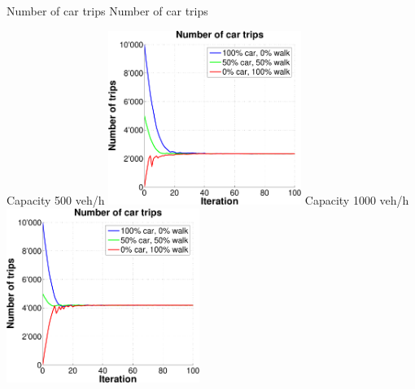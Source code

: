 {}

\createfigure%
{Number of car trips}%
{Number of car trips}%
{\label{fig:InitialModeAverageNumCarTrips}}%
{%
  \createsubfigure%
  {Capacity 500 veh/h}%
  {\includegraphics[width=0.47\textwidth, angle=0, trim=0mm 0mm 0mm 9mm, clip=true]{extending/figures/MultiModalSimulation/simulations/num_car_trips_500}}%
  {\label{}}%
  {\hspace{3mm}}%
  \createsubfigure%
  {Capacity 1000 veh/h}%
  {\includegraphics[width=0.47\textwidth, angle=0, trim=0mm 0mm 0mm 9mm, clip=true]{extending/figures/MultiModalSimulation/simulations/num_car_trips_1000}}%
  {\label{}}%
  {\vspace{7.5mm}}%

}

